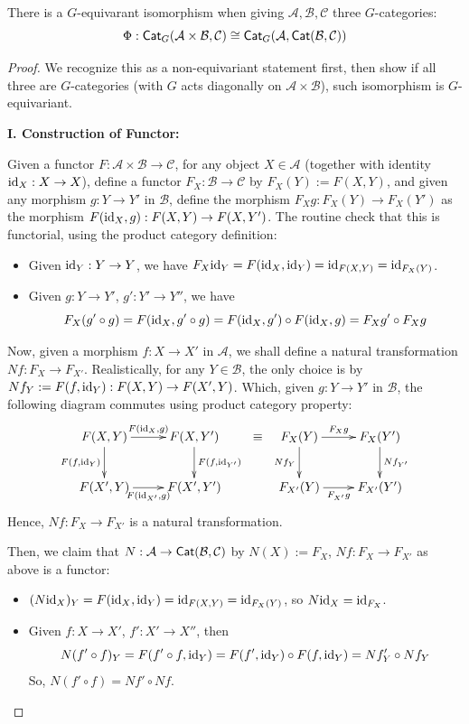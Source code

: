 \documentclass{article}
\begin{document}
\begin{prop}
There is a $G$-equivarant isomorphism when giving $\mathcal{A},\mathcal{B},\mathcal{C}$ three $G$-categories:
\[\Phi:\mathsf{Cat}_G(\mathcal{A}\times\mathcal{B},\mathcal{C})\cong \mathsf{Cat}_G(\mathcal{A},\mathsf{Cat}(\mathcal{B},\mathcal{C}))\]
\end{prop}
\begin{proof}
    We recognize this as a non-equivariant statement first, then show if all three are $G$-categories (with $G$ acts diagonally on $\mathcal{A}\times\mathcal{B}$), such isomorphism is $G$-equivariant.

    \hfil

    \textbf{I. Construction of Functor:}

    Given a functor $F:\mathcal{A}\times\mathcal{B}\rightarrow\mathcal{C}$, for any object $X\in\mathcal{A}$ (together with identity $\mathrm{id}_X:X\rightarrow X$), define a functor $F_X:\mathcal{B}\rightarrow \mathcal{C}$ by $F_X(Y):= F(X,Y)$, and given any morphism $g:Y\rightarrow Y'$ in $\mathcal{B}$, define the morphism $F_Xg:F_X(Y)\rightarrow F_X(Y')$ as the morphism $F(\mathrm{id}_X,g):F(X,Y)\rightarrow F(X,Y')$. The routine check that this is functorial, using the product category definition:
    \begin{itemize}
        \item Given $\mathrm{id}_Y:Y\rightarrow Y$, we have $F_X\mathrm{id}_Y = F(\mathrm{id}_X,\mathrm{id}_Y) = \mathrm{id}_{F(X,Y)} = \mathrm{id}_{F_X(Y)}$.
        \item Given $g:Y\rightarrow Y'$, $g':Y'\rightarrow Y''$, we have
        \[F_X(g'\circ g) = F(\mathrm{id}_X,g'\circ g) = F(\mathrm{id}_X,g')\circ F(\mathrm{id}_X,g) = F_Xg'\circ F_Xg\]
    \end{itemize}
    Now, given a morphism $f:X\rightarrow X'$ in $\mathcal{A}$, we shall define a natural transformation $Nf:F_X\rightarrow F_{X'}$. Realistically, for any $Y\in\mathcal{B}$, the only choice is by $Nf_Y:=F(f,\mathrm{id}_Y):F(X,Y)\rightarrow F(X',Y)$. Which, given $g:Y\rightarrow Y'$ in $\mathcal{B}$, the following diagram commutes using product category property:
    \[\xymatrix{
        F(X,Y) \ar[d]_-{F(f,\id_Y)} \ar[r]^-{F(\id_X,g)} & F(X,Y') \ar[d]^-{F(f,\id_{Y'})}\\
        F(X',Y)\ar[r]_-{F(\id_{X'},g)} & F(X',Y')
    }\ \equiv\ \xymatrix{
        F_X(Y) \ar[d]_-{Nf_Y} \ar[r]^-{F_Xg} & F_X(Y') \ar[d]^-{Nf_{Y'}}\\
        F_{X'}(Y)\ar[r]_-{F_{X'}g} & F_{X'}(Y')
    }\]
    Hence, $Nf:F_X\rightarrow F_{X'}$ is a natural transformation.

    Then, we claim that $N:\mathcal{A}\rightarrow \mathsf{Cat}(\mathcal{B},\mathcal{C})$ by $N(X):= F_X$, $Nf:F_X\rightarrow F_{X'}$ as above is a functor:
    \begin{itemize}
        \item $(N\mathrm{id}_X)_Y = F(\mathrm{id}_X,\mathrm{id}_Y) = \mathrm{id}_{F(X,Y)}=\mathrm{id}_{F_X(Y)}$, so $N\mathrm{id}_X=\mathrm{id}_{F_X}$.
        \item Given $f:X\rightarrow X'$, $f':X'\rightarrow X''$, then
        \[N(f'\circ f)_Y = F(f'\circ f,\mathrm{id}_Y) = F(f',\mathrm{id}_Y)\circ F(f,\mathrm{id}_Y) = Nf'_Y\circ Nf_Y\]
        So, $N(f'\circ f)=Nf'\circ Nf$.
    \end{itemize}


\end{proof}
\end{document}
